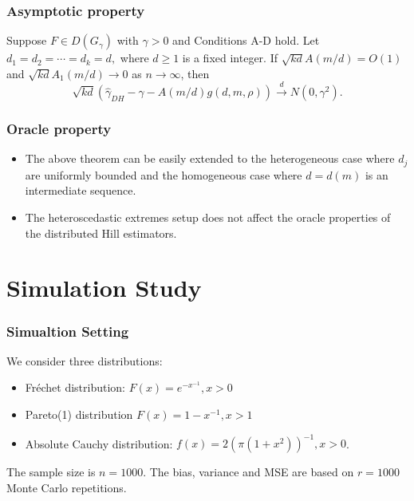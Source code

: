\documentclass{beamer}
\begin{document}
\begin{frame}
    \frametitle{Asymptotic property}
    \begin{theorem}
        Suppose $F \in D(G_{\gamma})$ with $\gamma>0$ and  Conditions A-D hold. Let $d_1=d_2=\cdots=d_k=d,$ where $d\ge 1$ is a fixed integer. If $\sqrt{kd}A(m/d)=O(1)$ and $\sqrt{kd}A_1(m/d) \to 0$ as $n \to \infty$, then
        $$
            \sqrt{kd}\left( \hat{\gamma}_{DH}-\gamma-A(m/d)g(d,m,\rho) \right) \stackrel{d}{\to} N(0,\gamma^2).
          $$
        \end{theorem}
\end{frame}

\begin{frame}
    \frametitle{Oracle property}
\begin{itemize}
    \item  The above theorem can be easily extended
    to the heterogeneous case where $d_j$ are uniformly bounded and the homogeneous case where $d=d(m)$ is an intermediate sequence.
    \bigskip
    \item The heteroscedastic extremes setup does not affect the oracle properties of the distributed Hill estimators.
\end{itemize}
    

\end{frame}
\section{Simulation Study}

\begin{frame}
    \frametitle{Simualtion Setting}
    We consider three distributions:
    \bigskip
\begin{itemize}
    \item Fr\'echet distribution: $F(x)=e^{-x^{-1}}, x>0$
    \medskip
    \item Pareto(1) distribution $F(x)=1-x^{-1}, x>1$
    \medskip
    \item Absolute Cauchy distribution: $f(x)=2(\pi(1+x^2))^{-1},x >0$.
\end{itemize}
\bigskip

    The sample size is $n=1000$. The bias, variance and MSE are based on $r=1000$ Monte Carlo  repetitions.

\end{frame}
\end{document}
